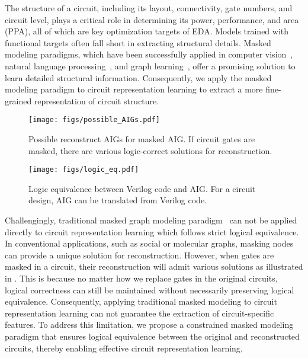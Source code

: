The structure of a circuit, including its layout, connectivity, gate numbers, and circuit level, plays a critical role in determining its power, performance, and area (PPA), all of which are key optimization targets of EDA. 
Models trained with functional targets often fall short in extracting structural details.
Masked modeling paradigms, which have been successfully applied in computer vision~\citep{he2022mae, bao2021beit}, natural language processing~\citep{kenton2019bert}, and graph learning~\citep{hou2023graphmae2, li2023maskgae}, offer a promising solution to learn detailed structural information. 
Consequently, we apply the masked modeling paradigm to circuit representation learning to extract a more fine-grained representation of circuit structure.

\begin{figure}[]
\centering
\begin{minipage}[t]{0.50\linewidth}
\centering
\texttt{[image: figs/possible\_AIGs.pdf]}
\caption{Possible reconstruct AIGs for masked AIG. If circuit gates are masked, there are various logic-correct solutions for reconstruction.}
\label{fig:logic_eq}
\end{minipage}
\hspace{6pt}
\begin{minipage}[t]{0.47\linewidth}
\centering
\texttt{[image: figs/logic\_eq.pdf]}
\caption{Logic equivalence between Verilog code and AIG. For a circuit design, AIG can be translated from Verilog code.}
\label{fig:mm_logic_eq}
\end{minipage}
\end{figure}

Challengingly, traditional masked graph modeling paradigm~\citep{hou2023graphmae2, li2023maskgae} can not be applied directly to circuit representation learning which follows strict logical equivalence. 
In conventional applications, such as social or molecular graphs, masking nodes can provide a unique solution for reconstruction. 
However, when gates are masked in a circuit, their reconstruction will admit various solutions as illustrated in . 
This is because no matter how we replace gates in the original circuits, logical correctness can still be maintained without necessarily preserving logical equivalence.
Consequently, applying traditional masked modeling to circuit representation learning can not guarantee the extraction of circuit-specific features. 
To address this limitation, we propose a constrained masked modeling paradigm that ensures logical equivalence between the original and reconstructed circuits, thereby enabling effective circuit representation learning.

